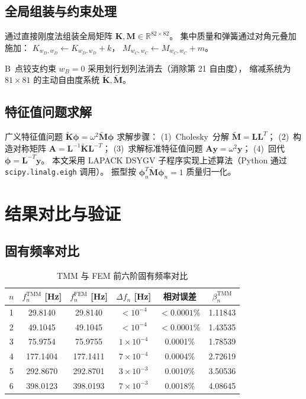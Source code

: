 \documentclass[twoside,12pt]{ctexart}
\newcommand{\TMM}{\text{TMM}}
\newcommand{\FEM}{\text{FEM}}
\newcommand{\betan}{\beta_n}
\begin{document}
\subsection{全局组装与约束处理}

通过直接刚度法组装全局矩阵 $\mathbf{K},\mathbf{M}\in\mathbb{R}^{82\times 82}$。
集中质量和弹簧通过对角元叠加施加：
$K_{w_D,w_D}\leftarrow K_{w_D,w_D}+k$，
$M_{w_C,w_C}\leftarrow M_{w_C,w_C}+m$。

B~点铰支约束 $w_B=0$ 采用划行划列法消去（消除第 21 自由度），
缩减系统为 $81\times 81$ 的主动自由度系统 $\tilde{\mathbf{K}},\tilde{\mathbf{M}}$。

\subsection{特征值问题求解}

广义特征值问题 $\tilde{\mathbf{K}}\bm{\phi}=\omega^2\tilde{\mathbf{M}}\bm{\phi}$ 求解步骤：
(1)~Cholesky~分解 $\tilde{\mathbf{M}}=\mathbf{L}\mathbf{L}^T$；
(2)~构造对称矩阵 $\mathbf{A}=\mathbf{L}^{-1}\tilde{\mathbf{K}}\mathbf{L}^{-T}$；
(3)~求解标准特征值问题 $\mathbf{A}\mathbf{y}=\omega^2\mathbf{y}$；
(4)~回代 $\bm{\phi}=\mathbf{L}^{-T}\mathbf{y}$。
本文采用 LAPACK DSYGV 子程序实现上述算法（Python 通过 \verb|scipy.linalg.eigh| 调用）。
振型按 $\bm{\phi}_n^T\tilde{\mathbf{M}}\bm{\phi}_n=1$ 质量归一化。

\section{结果对比与验证}

\subsection{固有频率对比}

\begin{table}[htbp]
  \centering
  \caption{TMM 与 FEM 前六阶固有频率对比}
  \label{tab:freq}
  \begin{tabular}{cccccc}
    \toprule
    $n$ & $f_n^{\TMM}$ [Hz] & $f_n^{\FEM}$ [Hz] &
    $\Delta f_n$ [Hz] & 相对误差 & $\betan^{\TMM}$ \\
    \midrule
    1 & 29.8140 & 29.8140 & $<10^{-4}$ & $<0.0001\%$ & 1.11843 \\
    2 & 49.1045 & 49.1045 & $<10^{-4}$ & $<0.0001\%$ & 1.43535 \\
    3 & 75.9754 & 75.9755 & $1\times10^{-4}$ & 0.0001\% & 1.78539 \\
    4 & 177.1404 & 177.1411 & $7\times10^{-4}$ & 0.0004\% & 2.72619 \\
    5 & 292.8670 & 292.8701 & $3\times10^{-3}$ & 0.0010\% & 3.50536 \\
    6 & 398.0123 & 398.0193 & $7\times10^{-3}$ & 0.0018\% & 4.08645 \\
    \bottomrule
  \end{tabular}
\end{table}
\end{document}
